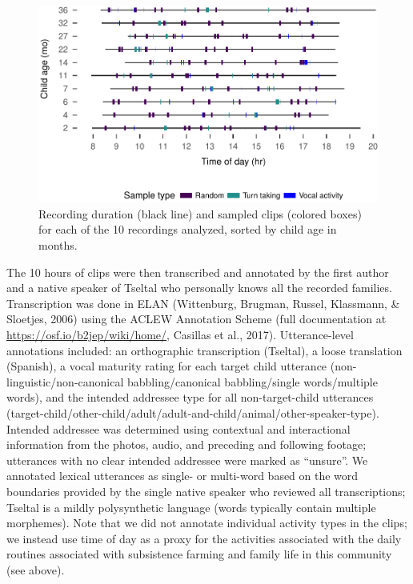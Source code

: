 \documentclass[floatsintext,man]{apa6}
\theoremstyle{definition}
\theoremstyle{definition}
\theoremstyle{definition}
\theoremstyle{remark}
\begin{document}
\begin{figure}
\centering
\includegraphics{Tseltal-CLE_files/figure-latex/fig2-1.pdf}
\caption{\label{fig:fig2}Recording duration (black line) and sampled clips
(colored boxes) for each of the 10 recordings analyzed, sorted by child
age in months.}
\end{figure}

The 10 hours of clips were then transcribed and annotated by the first
author and a native speaker of Tseltal who personally knows all the
recorded families. Transcription was done in ELAN (Wittenburg, Brugman,
Russel, Klassmann, \& Sloetjes, 2006) using the ACLEW Annotation Scheme
(full documentation at \url{https://osf.io/b2jep/wiki/home/}, Casillas
et al., 2017). Utterance-level annotations included: an orthographic
transcription (Tseltal), a loose translation (Spanish), a vocal maturity
rating for each target child utterance (non-linguistic/non-canonical
babbling/canonical babbling/single words/multiple words), and the
intended addressee type for all non-target-child utterances
(target-child/other-child/adult/adult-and-child/animal/other-speaker-type).
Intended addressee was determined using contextual and interactional
information from the photos, audio, and preceding and following footage;
utterances with no clear intended addressee were marked as
\enquote{unsure}. We annotated lexical utterances as single- or
multi-word based on the word boundaries provided by the single native
speaker who reviewed all transcriptions; Tseltal is a mildly
polysynthetic language (words typically contain multiple morphemes).
Note that we did not annotate individual activity types in the clips; we
instead use time of day as a proxy for the activities associated with
the daily routines associated with subsistence farming and family life
in this community (see above).
\end{document}
